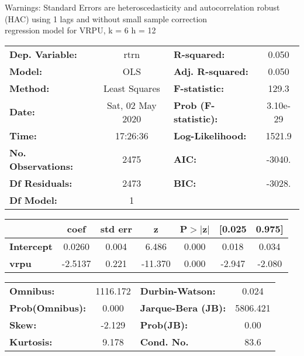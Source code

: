 Warnings: \newline
 [1] Standard Errors are heteroscedasticity and autocorrelation robust (HAC) using 1 lags and without small sample correction\\ 

regression model for VRPU, k = 6 h = 12\begin{center}
\begin{tabular}{lclc}
\toprule
\textbf{Dep. Variable:}    &       rtrn       & \textbf{  R-squared:         } &     0.050   \\
\textbf{Model:}            &       OLS        & \textbf{  Adj. R-squared:    } &     0.050   \\
\textbf{Method:}           &  Least Squares   & \textbf{  F-statistic:       } &     129.3   \\
\textbf{Date:}             & Sat, 02 May 2020 & \textbf{  Prob (F-statistic):} &  3.10e-29   \\
\textbf{Time:}             &     17:26:36     & \textbf{  Log-Likelihood:    } &    1521.9   \\
\textbf{No. Observations:} &        2475      & \textbf{  AIC:               } &    -3040.   \\
\textbf{Df Residuals:}     &        2473      & \textbf{  BIC:               } &    -3028.   \\
\textbf{Df Model:}         &           1      & \textbf{                     } &             \\
\bottomrule
\end{tabular}
\begin{tabular}{lcccccc}
                   & \textbf{coef} & \textbf{std err} & \textbf{z} & \textbf{P$> |$z$|$} & \textbf{[0.025} & \textbf{0.975]}  \\
\midrule
\textbf{Intercept} &       0.0260  &        0.004     &     6.486  &         0.000        &        0.018    &        0.034     \\
\textbf{vrpu}      &      -2.5137  &        0.221     &   -11.370  &         0.000        &       -2.947    &       -2.080     \\
\bottomrule
\end{tabular}
\begin{tabular}{lclc}
\textbf{Omnibus:}       & 1116.172 & \textbf{  Durbin-Watson:     } &    0.024  \\
\textbf{Prob(Omnibus):} &   0.000  & \textbf{  Jarque-Bera (JB):  } & 5806.421  \\
\textbf{Skew:}          &  -2.129  & \textbf{  Prob(JB):          } &     0.00  \\
\textbf{Kurtosis:}      &   9.178  & \textbf{  Cond. No.          } &     83.6  \\
\bottomrule
\end{tabular}
\end{center}

